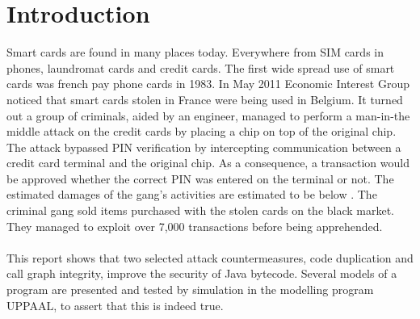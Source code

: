 \chapter{Introduction}
Smart cards are found in many places today. Everywhere from SIM cards in phones, laundromat cards and credit cards. The first wide spread use of smart cards was french pay phone cards in 1983\cite[p. 366]{modbank}. In May 2011 Economic Interest Group noticed that smart cards stolen in France were being used in Belgium. It turned out a group of criminals, aided by an engineer, managed to perform a man-in-the middle attack on the credit cards by placing a chip on top of the original chip. The attack bypassed PIN verification by intercepting communication between a credit card terminal and the original chip. As a consequence, a transaction would be approved whether the correct PIN was entered on the terminal or not. The estimated damages of the gang's activities are estimated to be below . The criminal gang sold items purchased with the stolen cards on the black market. They managed to exploit over 7,000 transactions before being apprehended.\\\\
This report shows that two selected attack countermeasures, code duplication and call graph integrity, improve the security of Java bytecode. Several models of a program are presented and tested by simulation in the modelling program UPPAAL, to assert that this is indeed true.